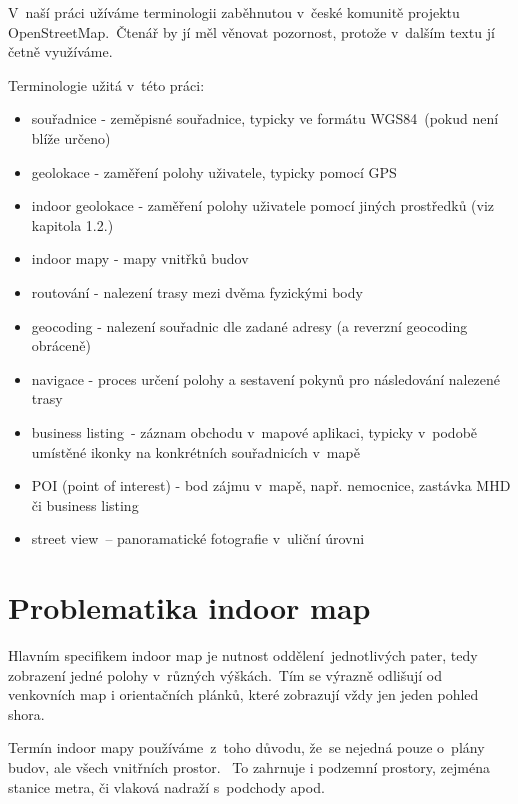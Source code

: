 \begin{introduction}
V~naší práci užíváme terminologii zaběhnutou v~české komunitě projektu OpenStreetMap.~Čtenář by jí měl věnovat pozornost, protože v~dalším textu jí četně využíváme.

Terminologie užitá v~této práci:

\begin{itemize}

\item
  souřadnice - zeměpisné souřadnice, typicky ve formátu WGS84~(pokud není blíže určeno)
\item
  geolokace - zaměření polohy uživatele, typicky pomocí GPS
\item
  indoor geolokace - zaměření polohy uživatele pomocí jiných prostředků (viz kapitola 1.2.)
\item
  indoor mapy - mapy vnitřků budov
\item
  routování - nalezení trasy mezi dvěma fyzickými body
\item
  geocoding - nalezení souřadnic dle zadané adresy (a reverzní geocoding obráceně)
\item
  navigace - proces určení polohy a sestavení pokynů pro následování nalezené trasy
\item
  business listing~- záznam obchodu v~mapové aplikaci, typicky v~podobě umístěné ikonky na konkrétních souřadnicích v~mapě
\item
  POI (point of interest) - bod zájmu v~mapě, např. nemocnice, zastávka MHD či business listing
\item
  street view~-- panoramatické fotografie v~uliční úrovni
\end{itemize}

\end{introduction}



\chapter{Problematika indoor map}\label{problematika-indoor-map}

Hlavním specifikem indoor map je nutnost oddělení~jednotlivých pater, tedy zobrazení jedné polohy v~různých výškách.~Tím se výrazně odlišují od venkovních map i orientačních plánků, které zobrazují vždy jen jeden pohled shora.

Termín indoor mapy používáme~z~toho důvodu, že~se nejedná pouze o~plány budov, ale všech vnitřních prostor. ~To zahrnuje i podzemní prostory, zejména stanice metra, či vlaková nadraží s~podchody apod.

